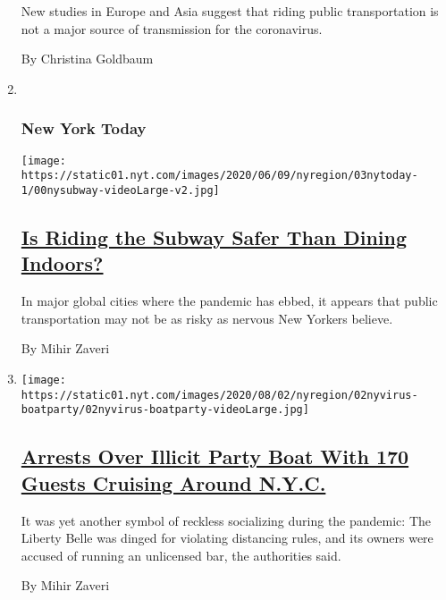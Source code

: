 \begin{enumerate}
  New studies in Europe and Asia suggest that riding public
  transportation is not a major source of transmission for the
  coronavirus.

  By Christina Goldbaum
\item ~
  \hypertarget{new-york-today}{%
  \subsubsection{New York Today}\label{new-york-today}}

  \texttt{[image: https://static01.nyt.com/images/2020/06/09/nyregion/03nytoday-1/00nysubway-videoLarge-v2.jpg]}

  \hypertarget{is-riding-the-subway-safer-than-dining-indoors}{%
  \subsection{\texorpdfstring{\href{/2020/08/03/nyregion/nyc-subway-coronavirus.html}{Is
  Riding the Subway Safer Than Dining
  Indoors?}}{Is Riding the Subway Safer Than Dining Indoors?}}\label{is-riding-the-subway-safer-than-dining-indoors}}

  In major global cities where the pandemic has ebbed, it appears that
  public transportation may not be as risky as nervous New Yorkers
  believe.

  By Mihir Zaveri
\item
  \texttt{[image: https://static01.nyt.com/images/2020/08/02/nyregion/02nyvirus-boatparty/02nyvirus-boatparty-videoLarge.jpg]}

  \hypertarget{arrests-over-illicit-party-boat-with-170-guests-cruising-around-nyc}{%
  \subsection{\texorpdfstring{\href{/2020/08/02/nyregion/liberty-belle-illegal-party.html}{Arrests
  Over Illicit Party Boat With 170 Guests Cruising Around
  N.Y.C.}}{Arrests Over Illicit Party Boat With 170 Guests Cruising Around N.Y.C.}}\label{arrests-over-illicit-party-boat-with-170-guests-cruising-around-nyc}}

  It was yet another symbol of reckless socializing during the pandemic:
  The Liberty Belle was dinged for violating distancing rules, and its
  owners were accused of running an unlicensed bar, the authorities
  said.

  By Mihir Zaveri
\end{enumerate}

